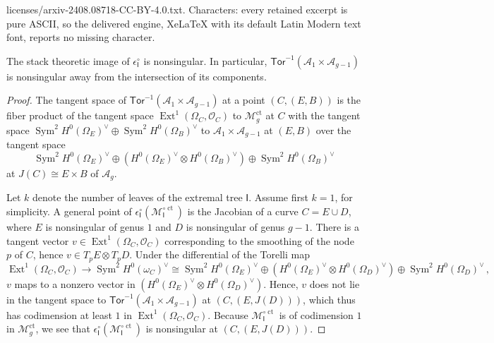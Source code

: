 \documentclass[10pt,a4paper]{amsart}
\DeclareMathOperator{\Ext}{Ext}
\DeclareMathOperator{\Sym}{Sym}
\DeclareMathOperator{\ct}{ct}
\newcommand{\A}{\mathcal{A}}
\newcommand{\M}{\mathcal{M}}
\newcommand{\Tor}{\mathsf{Tor}}
\renewcommand{\O}{\mathcal{O}}
\begin{document}
licenses/arxiv-2408.08718-CC-BY-4.0.txt. Characters: every retained excerpt is pure ASCII, so the delivered engine, XeLaTeX with its default Latin Modern text font, reports no missing character.
\begin{prop} \label{strictns}
    The stack theoretic image of $\epsilon^{\circ}_{\mathsf{I}}$ is nonsingular. In particular, $\Tor^{-1}(\A_1\times \A_{g-1})$ is nonsingular away from the intersection of its components. 
\end{prop}

\begin{proof}

    The tangent space of $\Tor^{-1}(\A_1\times \A_{g-1})$ at a point $(C,(E, B))$ is the fiber product of the tangent space $\Ext^1(\Omega_C,\O_C)$ to $\M_g^{\ct}$ at $C$ with the tangent space $\Sym^2 H^0(\Omega_E)^{\vee}\oplus \Sym^2 H^0(\Omega_B)^{\vee}$ to $\A_1\times \A_{g-1}$ at $(E,B)$ over the tangent space $$\Sym^2 H^0(\Omega_E)^{\vee}\oplus (H^0(\Omega_E)^{\vee}\otimes H^0(\Omega_B)^{\vee})  \oplus \Sym^2 H^0(\Omega_B)^{\vee}$$  at $J(C)\cong E\times B$ of $\A_g$. 
    
    Let $k$ denote the number of leaves of the extremal tree $\mathsf{I}$. 
    Assume first $k=1$, for simplicity. A general point of $\epsilon_{\mathsf{I}}^{\circ}(\M^{\circ \ct}_{\mathsf{I}})$ is the Jacobian of a curve $C=E\cup D$, where $E$ is nonsingular of genus $1$ and $D$ is nonsingular of genus $g-1$. There is a tangent vector $v\in \Ext^1(\Omega_C,\O_C)$ corresponding to the smoothing of the node $p$ of $C$, hence $v\in T_pE \otimes T_pD$. %
    Under the differential of the Torelli map
    \[
    \Ext^1(\Omega_C,\O_C)\rightarrow \Sym^2 H^0(\omega_C)^{\vee}\cong \Sym^2 H^0(\Omega_E)^{\vee}\oplus (H^0(\Omega_E)^{\vee}\otimes H^0(\Omega_{D})^{\vee})  \oplus \Sym^2 H^0(\Omega_D)^{\vee}\,,
    \]
    $v$ maps to a nonzero vector in $(H^0(\Omega_E)^{\vee}\otimes H^0(\Omega_{D})^{\vee})$. Hence, $v$ does not lie in the tangent space to $\Tor^{-1}(\A_1\times \A_{g-1})$ at $(C, (E,J(D)))$, which thus has codimension at least $1$ in $\Ext^1(\Omega_C,\O_C)$. Because $\M^{\circ \ct}_{\mathsf{I}}$ is of codimension $1$ in $\M_g^{\ct}$, we see that $\epsilon_{\mathsf{I}}^{\circ}(\M^{\circ \ct}_{\mathsf{I}})$ is nonsingular at $(C,(E,J(D)))$. 
    

\end{proof}
\end{document}
